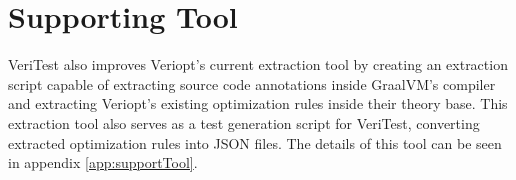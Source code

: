 \section{Supporting Tool}
\label{sec:Tool}

VeriTest also improves Veriopt's current extraction tool \cite[Sec. 7]{Term_Graph_Optimizations} by creating an extraction script capable of 
extracting source code annotations inside GraalVM's compiler and extracting Veriopt's existing optimization rules inside their theory base.
This extraction tool also serves as a test generation script for VeriTest, converting extracted optimization rules into JSON files. The details 
of this tool can be seen in appendix \ref{app:supportTool}.